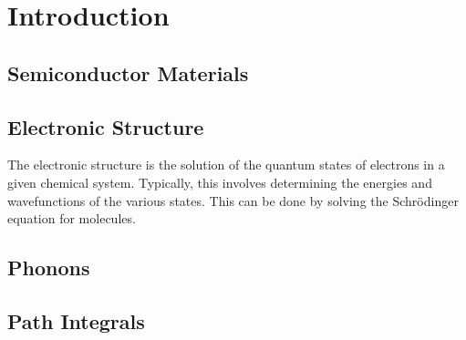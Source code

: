 
\chapter{Introduction} %

\label{Chapter1} %


\section{Semiconductor Materials}







\section{Electronic Structure}

The electronic structure is the solution of the quantum states of electrons in a given chemical system. Typically, this involves determining the energies and wavefunctions of the various states. This can be done by solving the Schr{\"o}dinger equation for molecules.




\section{Phonons}





\section{Path Integrals}


